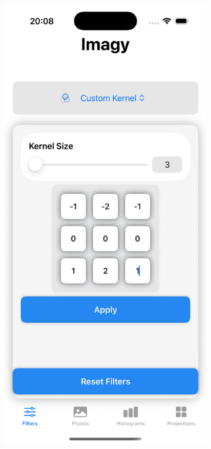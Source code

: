 \documentclass[a4paper]{article}
\begin{document}
\begin{figure}[H]
\begin{subfigure}{0.2\textwidth}
        \includegraphics[width=\linewidth]{images/custom_vertical.png}

\end{subfigure}
\end{figure}
\end{document}
